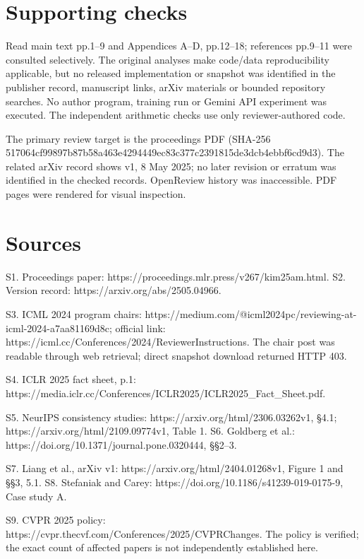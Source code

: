 \documentclass[10pt]{article}
\begin{document}
\section*{Supporting checks}
Read main text pp.1–9 and Appendices A–D, pp.12–18; references pp.9–11 were consulted selectively. The original analyses make code/data reproducibility applicable, but no released implementation or snapshot was identified in the publisher record, manuscript links, arXiv materials or bounded repository searches. No author program, training run or Gemini API experiment was executed. The independent arithmetic checks use only reviewer-authored code.\par
The primary review target is the proceedings PDF (SHA-256 517064cf99897b87b58a463e4294449ec83c377c2391815de3dcb4ebbf6cd9d3). The related arXiv record shows v1, 8 May 2025; no later revision or erratum was identified in the checked records. OpenReview history was inaccessible. PDF pages were rendered for visual inspection.\par
\section*{Sources}
S1. Proceedings paper: https://proceedings.mlr.press/v267/kim25am.html. S2. Version record: https://arxiv.org/abs/2505.04966.\par
S3. ICML 2024 program chairs: https://medium.com/@icml2024pc/reviewing-at-icml-2024-a7aa81169d8c; official link: https://icml.cc/Conferences/2024/ReviewerInstructions. The chair post was readable through web retrieval; direct snapshot download returned HTTP 403.\par
S4. ICLR 2025 fact sheet, p.1: https://media.iclr.cc/Conferences/ICLR2025/ICLR2025\_Fact\_Sheet.pdf.\par
S5. NeurIPS consistency studies: https://arxiv.org/html/2306.03262v1, §4.1; https://arxiv.org/html/2109.09774v1, Table 1. S6. Goldberg et al.: https://doi.org/10.1371/journal.pone.0320444, §§2–3.\par
S7. Liang et al., arXiv v1: https://arxiv.org/html/2404.01268v1, Figure 1 and §§3, 5.1. S8. Stefaniak and Carey: https://doi.org/10.1186/s41239-019-0175-9, Case study A.\par
S9. CVPR 2025 policy: https://cvpr.thecvf.com/Conferences/2025/CVPRChanges. The policy is verified; the exact count of affected papers is not independently established here.\par
\end{document}
